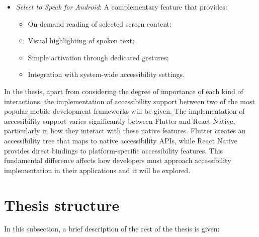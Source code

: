 \begin{itemize}
    \item \textit{Select to Speak for Android}: A complementary feature that provides:
        \begin{itemize}
            \item On-demand reading of selected screen content;
            \item Visual highlighting of spoken text;
            \item Simple activation through dedicated gestures;
            \item Integration with system-wide accessibility settings.
        \end{itemize}
\end{itemize}

In the thesis, apart from considering the degree of importance of each kind of interactions, the implementation of accessibility support between two of the most popular mobile development frameworks will be given. The implementation of accessibility support varies significantly between Flutter and React Native, particularly in how they interact with these native features. Flutter creates an accessibility tree that maps to native accessibility APIs, while React Native provides direct bindings to platform-specific accessibility features. This fundamental difference affects how developers must approach accessibility implementation in their applications and it will be explored. 

\section{Thesis structure}
\label{chap:intro-structure} 

In this subsection, a brief description of the rest of the thesis is given:

